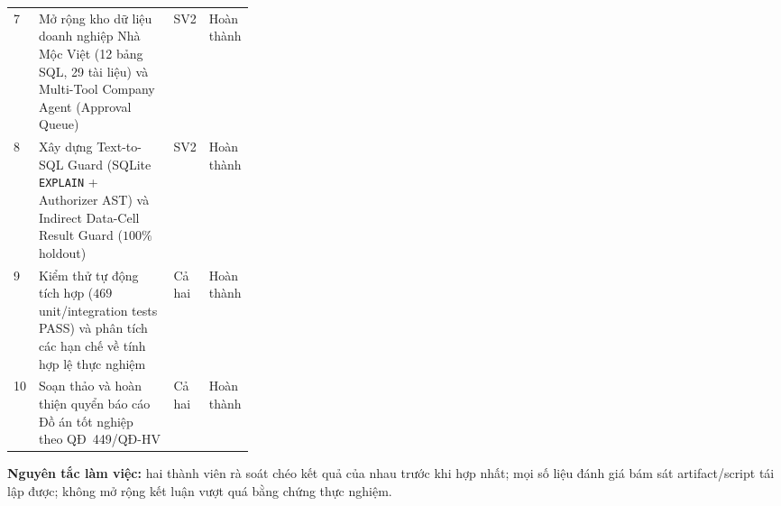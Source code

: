 \begin{table}[!htbp]
\begin{tabularx}{\linewidth}{@{}C{0.05\linewidth}X C{0.12\linewidth}C{0.14\linewidth}@{}}
7 & Mở rộng kho dữ liệu doanh nghiệp Nhà Mộc Việt (12 bảng SQL, 29 tài liệu) và Multi-Tool Company Agent (Approval Queue) & SV2 & Hoàn thành \\
8 & Xây dựng Text-to-SQL Guard (SQLite \texttt{EXPLAIN} + Authorizer AST) và Indirect Data-Cell Result Guard ($100\%$ holdout) & SV2 & Hoàn thành \\
9 & Kiểm thử tự động tích hợp ($469$ unit/integration tests PASS) và phân tích các hạn chế về tính hợp lệ thực nghiệm & Cả hai & Hoàn thành \\
10 & Soạn thảo và hoàn thiện quyển báo cáo Đồ án tốt nghiệp theo QĐ~449/QĐ-HV & Cả hai & Hoàn thành \\
\bottomrule
\end{tabularx}
\end{table}

\textbf{Nguyên tắc làm việc:} hai thành viên rà soát chéo kết quả của nhau trước khi hợp nhất; mọi số liệu đánh giá bám sát artifact/script tái lập được; không mở rộng kết luận vượt quá bằng chứng thực nghiệm.

